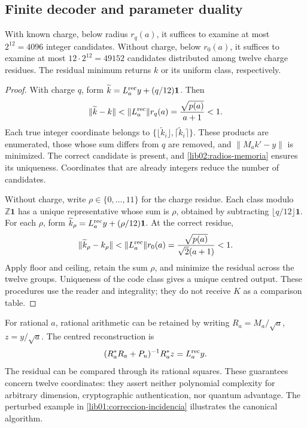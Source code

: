 \subsection{Finite decoder and parameter duality}
\label{lib02:computacion}

\begin{proposition}
\label{lib02:decodificador}
With known charge, below radius \(r_q(a)\), it suffices to examine at most \(2^{12}=4096\) integer candidates. Without charge, below \(r_0(a)\), it suffices to examine at most \(12\cdot2^{12}=49152\) candidates distributed among twelve charge residues. The residual minimum returns \(k\) or its uniform class, respectively.
\end{proposition}
\begin{proof}
With charge \(q\), form \(\widetilde k=L_a^{\rm rec}y+(q/12)\mathbf1\). Then
\[
 \|\widetilde k-k\|
 <\|L_a^{\rm rec}\|r_q(a)
 =\frac{\sqrt{p(a)}}{a+1}<1.
\]
Each true integer coordinate belongs to \(\{\lfloor\widetilde k_i\rfloor,
\lceil\widetilde k_i\rceil\}\). These products are enumerated, those whose sum differs from \(q\) are removed, and \(\|M_ak'-y\|\) is minimized. The correct candidate is present, and \cref{lib02:radios-memoria} ensures its uniqueness. Coordinates that are already integers reduce the number of candidates.

Without charge, write \(\rho\in\{0,\ldots,11\}\) for the charge residue. Each class modulo \(\mathbb Z\mathbf1\) has a unique representative whose sum is \(\rho\), obtained by subtracting \(\lfloor q/12\rfloor\mathbf1\). For each \(\rho\), form \(\widetilde k_\rho=L_a^{\rm rec}y+(\rho/12)\mathbf1\). At the correct residue,
\[
 \|\widetilde k_\rho-k_\rho\|
 <\|L_a^{\rm rec}\|r_0(a)
 =\frac{\sqrt{p(a)}}{\sqrt2(a+1)}<1.
\]
Apply floor and ceiling, retain the sum \(\rho\), and minimize the residual across the twelve groups. Uniqueness of the code class gives a unique centred output. These procedures use the reader and integrality; they do not receive \(K\) as a comparison table.
\end{proof}

For rational \(a\), rational arithmetic can be retained by writing \(R_a=M_a/\sqrt a\), \(z=y/\sqrt a\). The centred reconstruction is
\[
 (R_a^*R_a+P_u)^{-1}R_a^*z=L_a^{\rm rec}y.
\]
The residual can be compared through its rational squares. These guarantees concern twelve coordinates: they assert neither polynomial complexity for arbitrary dimension, cryptographic authentication, nor quantum advantage. The perturbed example in \cref{lib01:correccion-incidencia} illustrates the canonical algorithm.


